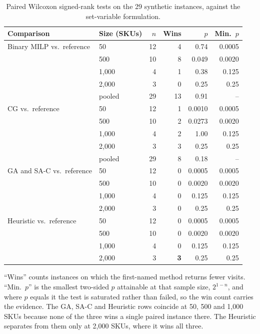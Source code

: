 \documentclass[11pt]{article}
\newcommand{\tbl}[1]{\caption{#1}}
\newcommand{\tabnote}[1]{\vspace{2pt}\footnotesize\raggedright #1\par}
\begin{document}
\begin{table}[H]
\centering
\tbl{Paired Wilcoxon signed-rank tests on the 29 synthetic instances, against the set-variable formulation.}
{\small\begin{tabular*}{\textwidth}{@{\extracolsep{\fill}}llrrrr@{}}
\toprule
Comparison & Size (SKUs) & $n$ & Wins & $p$ & Min.\ $p$ \\
\midrule
Binary MILP vs.\ reference & 50      & 12 & 4  & 0.74   & 0.0005 \\
                           & 500     & 10 & 8  & 0.049  & 0.0020 \\
                           & 1{,}000 & 4  & 1  & 0.38   & 0.125  \\
                           & 2{,}000 & 3  & 0  & 0.25   & 0.25   \\
                           & pooled  & 29 & 13 & 0.91   & --     \\
\midrule
CG vs.\ reference          & 50      & 12 & 1  & 0.0010 & 0.0005 \\
                           & 500     & 10 & 2  & 0.0273 & 0.0020 \\
                           & 1{,}000 & 4  & 2  & 1.00   & 0.125  \\
                           & 2{,}000 & 3  & 3  & 0.25   & 0.25   \\
                           & pooled  & 29 & 8  & 0.18   & --     \\
\midrule
GA and SA-C vs.\ reference & 50      & 12 & 0  & 0.0005 & 0.0005 \\
                           & 500     & 10 & 0  & 0.0020 & 0.0020 \\
                           & 1{,}000 & 4  & 0  & 0.125  & 0.125  \\
                           & 2{,}000 & 3  & 0  & 0.25   & 0.25   \\
\midrule
Heuristic vs.\ reference   & 50      & 12 & 0  & 0.0005 & 0.0005 \\
                           & 500     & 10 & 0  & 0.0020 & 0.0020 \\
                           & 1{,}000 & 4  & 0  & 0.125  & 0.125  \\
                           & 2{,}000 & 3  & \textbf{3}  & 0.25   & 0.25   \\
\bottomrule
\end{tabular*}}
\tabnote{``Wins'' counts instances on which the first-named method returns fewer visits. ``Min.\ $p$'' is the smallest two-sided $p$ attainable at that sample size, $2^{1-n}$, and where $p$ equals it the test is saturated rather than failed, so the win count carries the evidence. The GA, SA-C and Heuristic rows coincide at 50, 500 and 1{,}000 SKUs because none of the three wins a single paired instance there. The Heuristic separates from them only at 2{,}000 SKUs, where it wins all three.}
\label{tab:tests}
\end{table}
\end{document}
